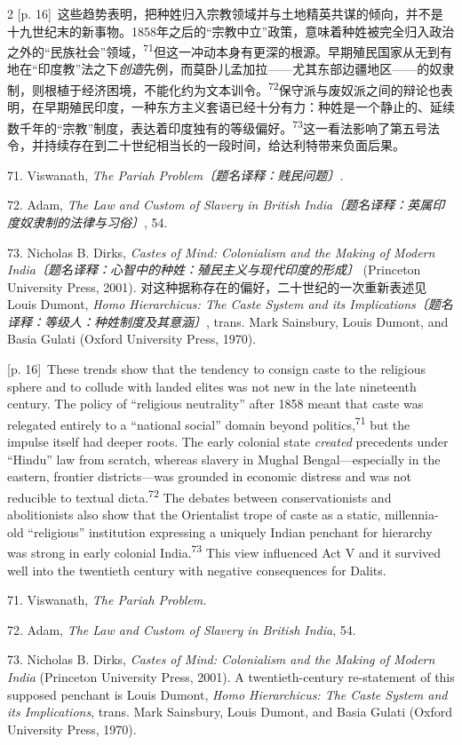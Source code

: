 \documentclass[10pt,a4paper]{article}
\begin{document}
\begin{paracol}{2}
{\scriptsize\color{gray} [p. 16]}\ 这些趋势表明，把种姓归入宗教领域并与土地精英共谋的倾向，并不是十九世纪末的新事物。1858年之后的“宗教中立”政策，意味着种姓被完全归入政治之外的“民族社会”领域，\nobreak\textsuperscript{71}但这一冲动本身有更深的根源。早期殖民国家从无到有地在“印度教”法之下\textit{创造}先例，而莫卧儿孟加拉——尤其东部边疆地区——的奴隶制，则根植于经济困境，不能化约为文本训\mbox{令。\textsuperscript{72}}保守派与废奴派之间的辩论也表明，在早期殖民印度，一种东方主义套语已经十分有力：种姓是一个静止的、延续数千年的“宗教”制度，表达着印度独有的等级偏\mbox{好。\textsuperscript{73}}这一看法影响了第五号法令，并持续存在到二十世纪相当长的一段时间，给达利特带来负面后果。\par{\small 71. Viswanath, \textit{The Pariah Problem〔题名译释：贱民问题〕.}\par}{\small 72. Adam, \textit{The Law and Custom of Slavery in British India〔题名译释：英属印度奴隶制的法律与习俗〕}, 54.\par}{\small 73. Nicholas B. Dirks, \textit{Castes of Mind: Colonialism and the Making of Modern India〔题名译释：心智中的种姓：殖民主义与现代印度的形成〕} (Princeton University Press, 2001). 对这种据称存在的偏好，二十世纪的一次重新表述见 Louis Dumont, \textit{Homo Hierarchicus: The Caste System and its Implications〔题名译释：等级人：种姓制度及其意涵〕}, trans. Mark Sainsbury, Louis Dumont, and Basia Gulati (Oxford University Press, 1970).\par}
\switchcolumn
{\scriptsize\color{gray} [p. 16]}\ These trends show that the tendency to consign caste to the religious sphere and to collude with landed elites was not new in the late nineteenth century. The policy of “religious neutrality” after 1858 meant that caste was relegated entirely to a “national social” domain beyond politics,\nobreak\textsuperscript{71} but the impulse itself had deeper roots. The early colonial state \textit{created} precedents under “Hindu” law from scratch, whereas slavery in Mughal Bengal—especially in the eastern, frontier districts—was grounded in economic distress and was not reducible to textual dicta.\nobreak\textsuperscript{72} The debates between conservationists and abolitionists also show that the Orientalist trope of caste as a static, millennia-old “religious” institution expressing a uniquely Indian penchant for hierarchy was strong in early colonial India.\nobreak\textsuperscript{73} This view influenced Act V and it survived well into the twentieth century with negative consequences for Dalits.\par{\small 71. Viswanath, \textit{The Pariah Problem.}\par}{\small 72. Adam, \textit{The Law and Custom of Slavery in British India}, 54.\par}{\small 73. Nicholas B. Dirks, \textit{Castes of Mind: Colonialism and the Making of Modern India} (Princeton University Press, 2001). A twentieth-century re-statement of this supposed penchant is Louis Dumont, \textit{Homo Hierarchicus: The Caste System and its Implications}, trans. Mark Sainsbury, Louis Dumont, and Basia Gulati (Oxford University Press, 1970).\par}

\end{paracol}
\end{document}
